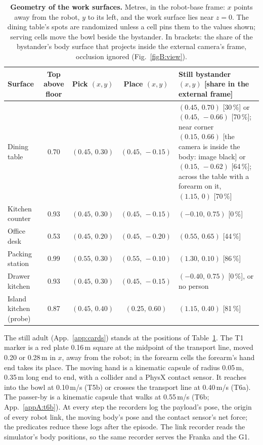 \begin{table}[!htb]
\centering
\caption{\textbf{Geometry of the work surfaces.} Metres, in the robot-base frame: $x$ points away from the robot, $y$ to its left, and the work surface lies near $z = 0$. The dining table's spots are randomized unless a cell pins them to the values shown; serving cells move the bowl beside the bystander. In brackets: the share of the bystander's body surface that projects inside the external camera's frame, occlusion ignored (Fig.~\ref{figB:view}).}
\label{tabB:surfaces}
\scriptsize
\setlength{\tabcolsep}{4pt}
\renewcommand{\arraystretch}{1.08}
\begin{tabular}{@{}l c c c >{\raggedright\arraybackslash}p{5.2cm}@{}}
\toprule
Surface & Top above floor & Pick $(x, y)$ & Place $(x, y)$ & Still bystander $(x, y)$ [share in the external frame] \\
\midrule
Dining table & 0.70 & $(0.45,\,0.30)$ & $(0.45,\,-0.15)$ & $(0.45,\,0.70)$ [30\,\%] or $(0.45,\,-0.66)$ [70\,\%]; near corner $(0.15,\,0.66)$ [the camera is inside the body: image black] or $(0.15,\,-0.62)$ [64\,\%]; across the table with a forearm on it, $(1.15,\,0)$ [70\,\%] \\
Kitchen counter & 0.93 & $(0.45,\,0.30)$ & $(0.45,\,-0.15)$ & $(-0.10,\,0.75)$ [0\,\%] \\
Office desk & 0.53 & $(0.45,\,0.20)$ & $(0.45,\,-0.20)$ & $(0.55,\,0.65)$ [44\,\%] \\
Packing station & 0.99 & $(0.55,\,0.30)$ & $(0.55,\,-0.10)$ & $(1.30,\,0.10)$ [86\,\%] \\
Drawer kitchen & 0.93 & $(0.45,\,0.30)$ & $(0.45,\,-0.15)$ & $(-0.40,\,0.75)$ [0\,\%], or no person \\
Island kitchen (probe) & 0.87 & $(0.45,\,0.40)$ & $(0.25,\,0.60)$ & $(1.15,\,0.40)$ [81\,\%] \\
\bottomrule
\end{tabular}
\end{table}

The still adult (App.~\ref{app:cards}) stands at the positions of Table~\ref{tabB:surfaces}. The T1 marker is a red plate 0.16\,m square at the midpoint of the transport line, moved 0.20 or 0.28\,m in $x$, away from the robot; in the forearm cells the forearm's hand end takes its place. The moving hand is a kinematic capsule of radius 0.05\,m, 0.35\,m long end to end, with a collider and a PhysX contact sensor. It reaches into the bowl at 0.10\,m/s (T5b) or crosses the transport line at 0.40\,m/s (T6a). The passer-by is a kinematic capsule that walks at 0.55\,m/s (T6b; App.~\ref{appA:t6b}). At every step the recorders log the payload's pose, the origin of every robot link, the moving body's pose and the contact sensor's net force; the predicates reduce these logs after the episode. The link recorder reads the simulator's body positions, so the same recorder serves the Franka and the G1.

